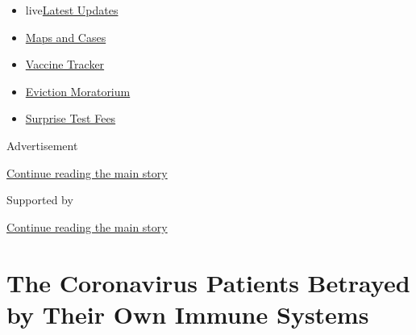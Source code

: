 \begin{itemize}
\tightlist
\item
  live\href{https://www.nytimes3xbfgragh.onion/2020/09/09/world/covid-19-coronavirus.html?name=styln-coronavirus-national\&region=TOP_BANNER\&block=storyline_menu_recirc\&action=click\&pgtype=Article\&impression_id=7bc8d6a1-f2ba-11ea-bb9c-a332a2ba7fb3\&variant=undefined}{Latest
  Updates}
\item
  \href{https://www.nytimes3xbfgragh.onion/interactive/2020/us/coronavirus-us-cases.html?name=styln-coronavirus-national\&region=TOP_BANNER\&block=storyline_menu_recirc\&action=click\&pgtype=Article\&impression_id=7bc8d6a2-f2ba-11ea-bb9c-a332a2ba7fb3\&variant=undefined}{Maps
  and Cases}
\item
  \href{https://www.nytimes3xbfgragh.onion/interactive/2020/science/coronavirus-vaccine-tracker.html?name=styln-coronavirus-national\&region=TOP_BANNER\&block=storyline_menu_recirc\&action=click\&pgtype=Article\&impression_id=7bc8fdb0-f2ba-11ea-bb9c-a332a2ba7fb3\&variant=undefined}{Vaccine
  Tracker}
\item
  \href{https://www.nytimes3xbfgragh.onion/2020/09/02/your-money/eviction-moratorium-covid.html?name=styln-coronavirus-national\&region=TOP_BANNER\&block=storyline_menu_recirc\&action=click\&pgtype=Article\&impression_id=7bc8fdb1-f2ba-11ea-bb9c-a332a2ba7fb3\&variant=undefined}{Eviction
  Moratorium}
\item
  \href{https://www.nytimes3xbfgragh.onion/2020/09/09/upshot/coronavirus-surprise-test-fees.html?name=styln-coronavirus-national\&region=TOP_BANNER\&block=storyline_menu_recirc\&action=click\&pgtype=Article\&impression_id=7bc8fdb2-f2ba-11ea-bb9c-a332a2ba7fb3\&variant=undefined}{Surprise
  Test Fees}
\end{itemize}

Advertisement

\protect\hyperlink{after-top}{Continue reading the main story}

Supported by

\protect\hyperlink{after-sponsor}{Continue reading the main story}

\hypertarget{the-coronavirus-patients-betrayed-by-their-own-immune-systems}{%
\section{The Coronavirus Patients Betrayed by Their Own Immune
Systems}\label{the-coronavirus-patients-betrayed-by-their-own-immune-systems}}

